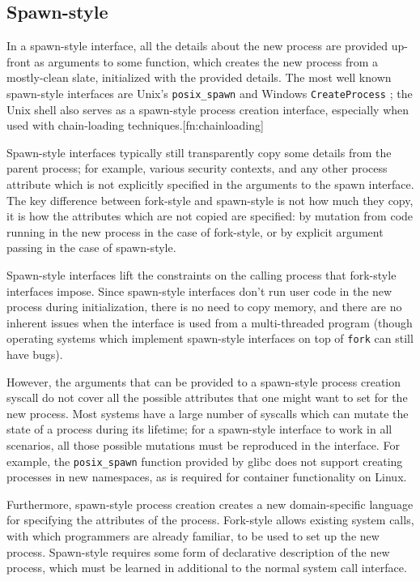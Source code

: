 \documentclass[sigplan]{acmart}
\begin{document}
\subsection{Spawn-style}
In a spawn-style interface,
all the details about the new process are provided up-front as arguments to some function,
which creates the new process from a mostly-clean slate, initialized with the provided details.
The most well known spawn-style interfaces are Unix's \texttt{posix\_spawn} \cite{posix_spawn}
and Windows \texttt{CreateProcess} \cite{create_process};
the Unix shell also serves as a spawn-style process creation interface,
especially when used with chain-loading techniques.[fn:chainloading]

Spawn-style interfaces typically still transparently copy some details from the parent process;
for example, various security contexts,
and any other process attribute which is not explicitly specified in the arguments to the spawn interface.
The key difference between fork-style and spawn-style is not how much they copy,
it is how the attributes which are not copied are specified:
by mutation from code running in the new process in the case of fork-style,
or by explicit argument passing in the case of spawn-style.

Spawn-style interfaces lift the constraints on the calling process that fork-style interfaces impose.
Since spawn-style interfaces don't run user code in the new process during initialization,
there is no need to copy memory,
and there are no inherent issues when the interface is used from a multi-threaded program
(though operating systems which implement spawn-style interfaces on top of \texttt{fork} can still have bugs).

However, the arguments that can be provided to a spawn-style process creation syscall
do not cover all the possible attributes that one might want to set for the new process.
Most systems have a large number of syscalls which can mutate the state of a process during its lifetime;
for a spawn-style interface to work in all scenarios,
all those possible mutations must be reproduced in the interface.
For example, the \texttt{posix\_spawn} function provided by glibc does not support creating processes in new namespaces,
as is required for container functionality on Linux.

Furthermore, spawn-style process creation
creates a new domain-specific language for specifying the attributes of the process.
Fork-style allows existing system calls,
with which programmers are already familiar,
to be used to set up the new process.
Spawn-style requires some form of declarative description of the new process,
which must be learned in additional to the normal system call interface.
\end{document}
